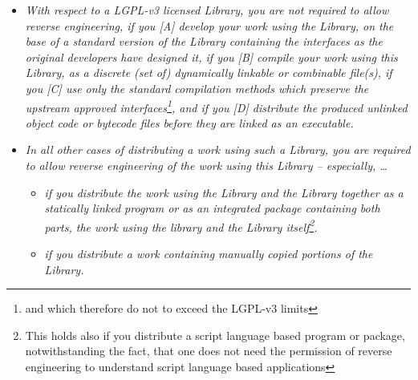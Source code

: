 \begin{itemize}  
  \item \emph{With respect to a LGPL-v3 licensed Library, you are not required
  to allow reverse engineering, if you [A] develop your work using the Library,
  on the base of a standard version of the Library containing the interfaces as
  the original developers have designed it, if you [B] compile your work using
  this Library, as a discrete (set of) dynamically linkable or combinable
  file(s), if you [C] use only the standard compilation methods which preserve
  the upstream approved interfaces\footnote{and which therefore do not to exceed
  the LGPL-v3 limits}, and if you [D] distribute the produced unlinked object
  code or bytecode files before they are linked as an executable.}
  \item \emph{In all other cases of distributing a work using such a Library,
  you are required to allow reverse engineering of the work using this Library
  -- especially, \ldots}
  \begin{itemize}
    \item \emph{if you distribute the work using the Library and the Library
    together as a statically linked program or as an integrated package
    containing both parts, the work using the library and the Library
    itself\footnote{This holds also if you distribute a script language based
    program or package, notwithstanding the fact, that one does not need the
    permission of reverse engineering to understand script language based
    applications}.}
    \item \emph{if you distribute a work containing manually copied portions of
    the Library.}
  \end{itemize}
\end{itemize}



